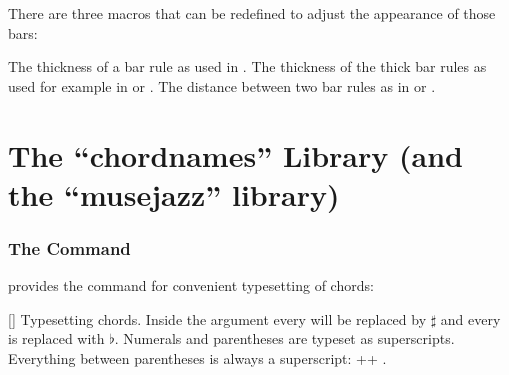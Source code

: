 \documentclass[load-preamble+]{cnltx-doc}
\def\library*#1{``#1''}%
\begin{document}
There are three macros that can be redefined to adjust the appearance of those
bars:
\begin{commands}
  \Default{.02em}
    The thickness of a bar rule as used in .
  \Default{.15em}
    The thickness of the thick bar rules as used for example in
     or .
  \Default{.1em}
    The distance between two bar rules as in  or .
\end{commands}

\clearpage
\part{The \library*{chordnames} Library (and the \library*{musejazz} library)}\label{part:chordnames-library}

\section{The  Command}

\chordnames{} provides the command  for convenient
typesetting of chords:

\begin{example}
   
   
\end{example}

\begin{commands}
  []
    Typesetting chords.  Inside the argument every \code{\#} will be replaced
    by $\sharp$ and every  is replaced with $\flat$.  Numerals and
    parentheses are typeset as superscripts.  Everything between parentheses
    is always a superscript: \verbcode++
    .
\end{commands}
\end{document}
